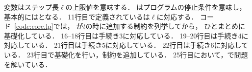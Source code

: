 変数はステップ長$\ell$の上限値を意味する．
はプログラムの停止条件を意味し，
基本的にはとなる．
11行目で定義されているは$\ell$に対応する．
コード~\ref{code:core.lp}では，
が$t$の時に追加する制約を列挙してから，
ひとまとめに基礎化している．
16--18行目は手続き3に対応している．
19--20行目は手続き4に対応している．
21行目は手続き5に対応している．
22行目は手続き6に対応している．
23行目で基礎化を行い，制約を追加している．
25行目において，で問題を解いている．

%
